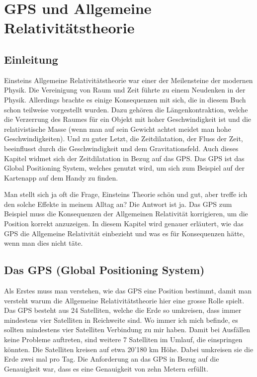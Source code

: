 
\chapter{GPS und Allgemeine Relativitätstheorie\label{chapter:thema}}
\begin{refsection}

\section{Einleitung}
Einsteins Allgemeine Relativitätstheorie war einer der Meilensteine der modernen Physik. Die Vereinigung von Raum und Zeit führte zu einem Neudenken in der Physik. Allerdings brachte es einige Konsequenzen mit sich, die in diesem Buch schon teilweise vorgestellt wurden. Dazu gehören die Längenkontraktion, welche die Verzerrung des Raumes für ein Objekt mit hoher Geschwindigkeit ist und die relativistische Masse (wenn man auf sein Gewicht achtet meidet man hohe Geschwindigkeiten). Und zu guter Letzt, die Zeitdilatation, der Fluss der Zeit, beeinflusst durch die Geschwindigkeit und dem Gravitationsfeld. Auch dieses Kapitel widmet sich der Zeitdilatation in Bezug auf das GPS. Das GPS ist das Global Positioning System, welches genutzt wird, um sich zum Beispiel auf der Kartenapp auf dem Handy zu finden.
%
%

Man stellt sich ja oft die Frage, Einsteins Theorie schön und gut, aber treffe ich den solche Effekte in meinem Alltag an? Die Antwort ist ja. Das GPS zum Beispiel muss die Konsequenzen der Allgemeinen Relativität korrigieren, um die Position korrekt anzuzeigen. In diesem Kapitel wird genauer erläutert, wie das GPS die Allgemeine Relativität einbezieht und was es für Konsequenzen hätte, wenn man dies nicht täte.

\section{Das GPS (Global Positioning System)}
Als Erstes muss man verstehen, wie das GPS eine Position bestimmt, damit man versteht warum die Allgemeine Relativitätstheorie hier eine grosse Rolle spielt. Das GPS besteht aus 24 Satelliten, welche die Erde so umkreisen, dass immer mindestens vier Satelliten in Reichweite sind. Wo immer ich mich befinde, es sollten mindestens vier Satelliten Verbindung zu mir haben. Damit bei Ausfällen keine Probleme auftreten, sind weitere 7 Satelliten im Umlauf, die einspringen könnten. Die Satelliten kreisen auf etwa 20'180 km Höhe. Dabei umkreisen sie die Erde zwei mal pro Tag. Die Anforderung an das GPS in Bezug auf die Genauigkeit war, dass es eine Genauigkeit von zehn Metern erfüllt. 


\end{refsection}
